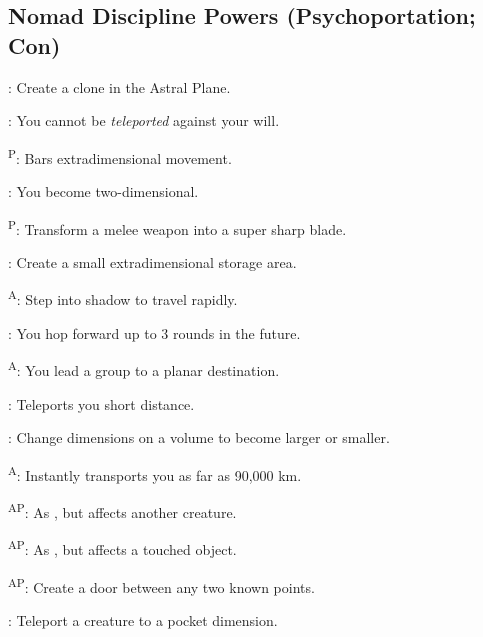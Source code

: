 \subsection{Nomad Discipline Powers {\normalsize(Psychoportation; Con)}}
\begin{enumerate*}
\item {}: Create a clone in the Astral Plane.

      : You cannot be \emph{teleported} against your will.

\item {}\textsuperscript{P}: Bars extradimensional movement.

      : You become two-dimensional.

\item {}\textsuperscript{P}: Transform a melee weapon into a super sharp blade.

      : Create a small extradimensional storage area.

      \textsuperscript{A}: Step into shadow to travel rapidly.

      : You hop forward up to 3 rounds in the future.

\item {}\textsuperscript{A}: You lead a group to a planar destination.

      : Teleports you short distance. %

      : Change dimensions on a volume to become larger or smaller.

\item {}\textsuperscript{A}: Instantly transports you as far as 90,000 km.

      \textsuperscript{AP}: As , but affects another creature.

      \textsuperscript{AP}: As , but affects a touched object.

      \textsuperscript{AP}: Create a door between any two known points.

\item {}: Teleport a creature to a pocket dimension.


\end{enumerate*}

